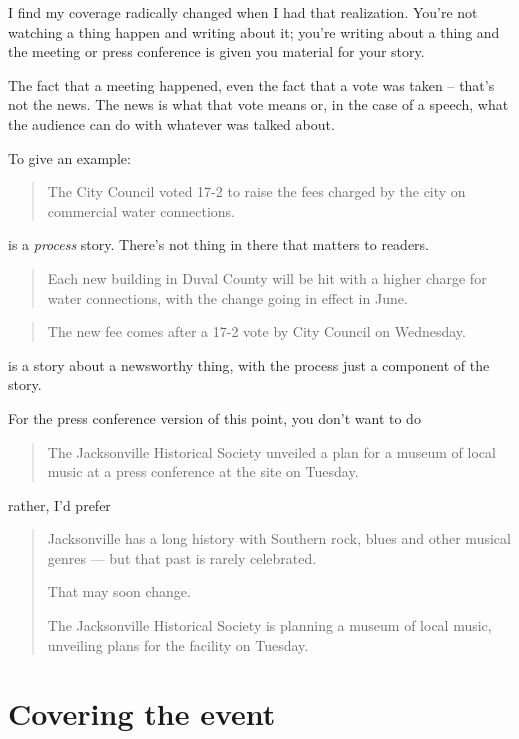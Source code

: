 \documentclass[
  11pt,
  american,
  letterpaperpaper,
  extrafontsizes,onecolumn,openright
  ]{memoir}
\begin{document}
I find my coverage radically changed when I had that realization. You're not watching a thing happen and writing about it; you're writing about a thing and the meeting or press conference is given you material for your story.

The fact that a meeting happened, even the fact that a vote was taken -- that's not the news. The news is what that vote means or, in the case of a speech, what the audience can do with whatever was talked about.

To give an example:

\begin{quote}
The City Council voted 17-2 to raise the fees charged by the city on commercial water connections.
\end{quote}

is a \emph{process} story. There's not thing in there that matters to readers.

\begin{quote}
Each new building in Duval County will be hit with a higher charge for water connections, with the change going in effect in June.
\end{quote}

\begin{quote}
The new fee comes after a 17-2 vote by City Council on Wednesday.
\end{quote}

is a story about a newsworthy thing, with the process just a component of the story.

For the press conference version of this point, you don't want to do

\begin{quote}
The Jacksonville Historical Society unveiled a plan for a museum of local music at a press conference at the site on Tuesday.
\end{quote}

rather, I'd prefer

\begin{quote}
Jacksonville has a long history with Southern rock, blues and other musical genres --- but that past is rarely celebrated.

That may soon change.

The Jacksonville Historical Society is planning a museum of local music, unveiling plans for the facility on Tuesday.
\end{quote}

\hypertarget{covering-the-event}{%
\section*{Covering the event}\label{covering-the-event}}
\end{document}
